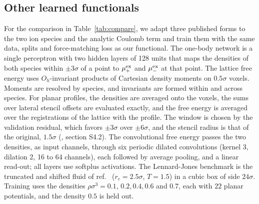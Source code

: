 \subsection*{Other learned functionals}
For the comparison in Table~\ref{tab:compare}, we adapt three published forms to the two ion species and the analytic Coulomb term and train them with the same data, splits and force-matching loss as our functional. The one-body network \cite{sammuller2023neural,bui2025learning} is a single perceptron with two hidden layers of 128 units that maps the densities of both species within $\pm3\sigma$ of a point to $\mu^{\rm ex}_+$ and $\mu^{\rm ex}_-$ at that point. The lattice free energy \cite{cheng2026equivariant} uses $O_h$-invariant products of Cartesian density moments on $0.5\sigma$ voxels. Moments are resolved by species, and invariants are formed within and across species. For planar profiles, the densities are averaged onto the voxels, the sums over lateral stencil offsets are evaluated exactly, and the free energy is averaged over the registrations of the lattice with the profile. The window is chosen by the validation residual, which favors $\pm3\sigma$ over $\pm6\sigma$, and the stencil radius is that of the original, $1.5\sigma$ (\siref, section S4.2). The convolutional free energy \cite{dijkman2025learning} passes the two densities, as input channels, through six periodic dilated convolutions (kernel 3, dilation 2, 16 to 64 channels), each followed by average pooling, and a linear read-out; all layers use softplus activations. The Lennard-Jones benchmark is the truncated and shifted fluid of ref.~\cite{cheng2026equivariant} ($r_c=2.5\sigma$, $T=1.5$) in a cubic box of side $24\sigma$. Training uses the densities $\rho\sigma^3=0.1$, $0.2, 0.4, 0.6$ and $0.7$, each with $22$ planar potentials, and the density $0.5$ is held out.